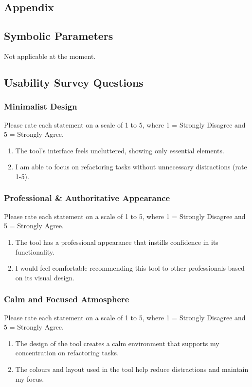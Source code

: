 \documentclass[12pt, titlepage]{article}
\begin{document}


\newpage

\begin{appendices}

\section{Appendix}


\subsection{Symbolic Parameters}

Not applicable at the moment.

\subsection{Usability Survey Questions} \label{A.2}

\subsubsection*{Minimalist Design}
Please rate each statement on a scale of 1 to 5, where 1 = Strongly Disagree and 5 = Strongly Agree.
\begin{enumerate}
  \item The tool's interface feels uncluttered, showing only essential elements.
  \item I am able to focus on refactoring tasks without unnecessary distractions (rate 1-5).
\end{enumerate}

\subsubsection*{Professional \& Authoritative Appearance}
Please rate each statement on a scale of 1 to 5, where 1 = Strongly Disagree and 5 = Strongly Agree.
\begin{enumerate}
  \item The tool has a professional appearance that instills confidence in its functionality.
  \item I would feel comfortable recommending this tool to other professionals based on its visual design.
\end{enumerate}

\subsubsection*{Calm and Focused Atmosphere}
Please rate each statement on a scale of 1 to 5, where 1 = Strongly Disagree and 5 = Strongly Agree.
\begin{enumerate}
  \item The design of the tool creates a calm environment that supports my concentration on refactoring tasks.
  \item The colours and layout used in the tool help reduce distractions and maintain my focus.
\end{enumerate}


\end{appendices}
\end{document}
